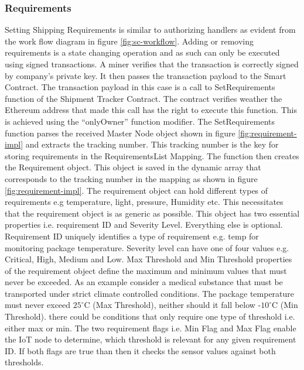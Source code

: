 \subsubsection{Requirements}
Setting Shipping Requirements is similar to authorizing handlers as evident from the work flow diagram in figure \ref{fig:sc-workflow}. Adding or removing requirements is a state changing operation and as such can only be executed using signed transactions. A miner verifies that the transaction is correctly signed by company’s private key. It then passes the transaction payload to the Smart Contract. The transaction payload in this case is a call to SetRequirements function of the Shipment Tracker Contract. The contract verifies weather the Ethereum address that made this call has the right to execute this function. This is achieved using the “onlyOwner” function modifier.  The SetRequirements function parses the received Master Node object shown in figure \ref{fig:requirement-impl} and extracts the tracking number. This tracking number is the key for storing requirements in the RequirementsList Mapping. The function then creates the Requirement object. This object is saved in the dynamic array that corresponds to the tracking number in the mapping as shown in figure  \ref{fig:requirement-impl}. The requirement object can hold different types of requirements e.g temperature, light, pressure, Humidity etc. This necessitates that the requirement object is as generic as possible. This object has two essential properties i.e. requirement ID and Severity Level. Everything else is optional. Requirement ID uniquely identifies a type of requirement e.g. temp for monitoring package temperature. Severity level can have one of four values e.g. Critical, High, Medium and Low. Max Threshold and Min Threshold properties of the requirement object define the maximum and minimum values that must never be exceeded. As an example consider a medical substance that must be transported under strict climate controlled conditions. The package temperature must never exceed $25^\circ$C (Max Threshold), neither should it fall below -$10^\circ$C (Min Threshold). there could be conditions that only require one type of threshold i.e. either max or min. The two requirement flags i.e. Min Flag and Max Flag enable the IoT node to determine, which threshold is relevant for any given requirement ID. If both flags are true than then it checks the sensor values against both thresholds.  
\vspace{1mm}
